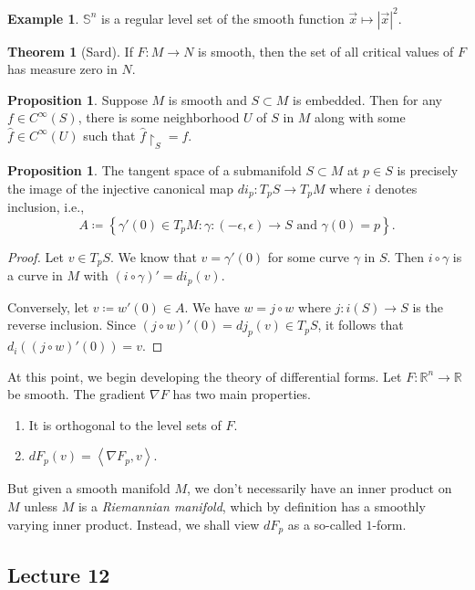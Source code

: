 \documentclass[10pt,letterpaper,cm]{nupset}
\theoremstyle{definition}
\newtheorem{exmp}[definition]{Example}
\theoremstyle{theorem}
\newtheorem{theorem}[definition]{Theorem}
\newtheorem{prop}[definition]{Proposition}
\theoremstyle{remark}
\newcommand{\R}{\mathbb R}
\renewcommand{\S}{\mathbb S}
\newcommand{\1}{\mathbf{1}}
\newcommand{\x}{\vec x}
\newcommand{\0}{\vec 0}
\begin{document}
\begin{exmp}
$\S^n$ is a regular level set of the smooth function $\x\mapsto \left\lvert{\x}\right\rvert^2$.
\end{exmp}

\begin{theorem}[Sard]\label{sard}
If $F: M \to N$ is smooth, then the set of all critical values of $F$ has measure zero in $N$.
\end{theorem}

\begin{prop}
Suppose $M$ is smooth and $S\subset M$ is embedded. Then for any $f \in C^{\infty}(S)$, there is some neighborhood $U$ of $S$ in $M$ along with some $\hat{f} \in C^{\infty}(U)$ such that $\hat{f}\restriction_S = f$.
\end{prop}
\begin{prop}
The tangent space of a submanifold $S \subset M$ at $p\in S$ is precisely the image of the injective canonical map $di_p : T_pS \to T_p M$ where $i$ denotes inclusion, i.e., $$A\coloneqq \left\{ \gamma ' (0) \in T_pM : \gamma : ({-\epsilon}, \epsilon) \to S \text{ and } \gamma(0) =p\right\}.$$
\end{prop}
\begin{proof}
Let $v \in T_pS$. We know that $v= \gamma'(0)$ for some curve $\gamma$ in $S$. Then $i \circ \gamma$ is a curve in $M$ with $\left(i \circ \gamma\right)'= di_p(v)$. 

Conversely, let $v\coloneqq  w'(0) \in A$. We have $w = j \circ w$ where $j: i(S) \to S$ is the reverse inclusion. Since $\left(j \circ w\right)'(0) = dj_p(v) \in T_pS$, it follows that $d_i((j \circ w)'(0)) = v$.
\end{proof}

\bigskip


At this point, we begin developing the theory of differential forms. Let $F: \R^n \to \R$ be smooth. The gradient $\nabla F$ has two main properties.
\begin{enumerate}
\item It is orthogonal to the level sets of $F$.
\item $dF_p(v) = \left\langle \nabla F_p, v\right\rangle$.
\end{enumerate}
But given a smooth manifold $M$, we don't necessarily have an inner product on $M$ unless $M$ is a \textit{Riemannian manifold}, which by definition has a smoothly varying inner product.  Instead, we shall view $dF_p$ as a so-called $1$-form.


\subsection{Lecture 12}
\end{document}
